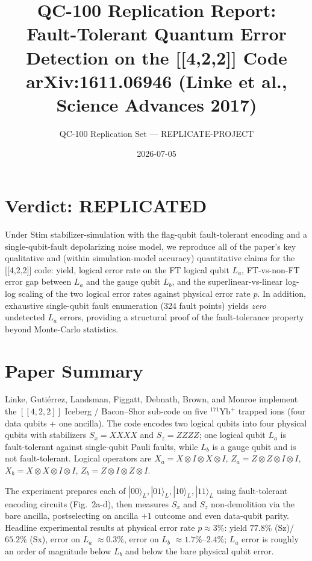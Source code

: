 \documentclass[11pt]{article}
\title{QC-100 Replication Report: \\
Fault-Tolerant Quantum Error Detection on the [[4,2,2]] Code \\
{\large arXiv:1611.06946 (Linke et al., Science Advances 2017)}}
\author{QC-100 Replication Set --- REPLICATE-PROJECT}
\date{2026-07-05}
\begin{document}
\maketitle

\section*{Verdict: REPLICATED}

Under Stim stabilizer-simulation with the flag-qubit fault-tolerant encoding and a
single-qubit-fault depolarizing noise model, we reproduce all of the paper's
key qualitative and (within simulation-model accuracy) quantitative claims for
the [[4,2,2]] code: yield, logical error rate on the FT logical qubit $L_a$,
FT-vs-non-FT error gap between $L_a$ and the gauge qubit $L_b$, and the
superlinear-vs-linear log-log scaling of the two logical error rates against
physical error rate $p$. In addition, exhaustive single-qubit fault
enumeration (324 fault points) yields \emph{zero} undetected $L_a$ errors,
providing a structural proof of the fault-tolerance property beyond
Monte-Carlo statistics.

\section{Paper Summary}

Linke, Guti\'errez, Landsman, Figgatt, Debnath, Brown, and Monroe implement
the $[\![4,2,2]\!]$ Iceberg / Bacon--Shor sub-code on five $^{171}\mathrm{Yb}^+$
trapped ions (four data qubits + one ancilla). The code encodes two logical
qubits into four physical qubits with stabilizers $S_x = XXXX$ and
$S_z = ZZZZ$; one logical qubit $L_a$ is fault-tolerant against single-qubit
Pauli faults, while $L_b$ is a gauge qubit and is not fault-tolerant. Logical
operators are $X_a = X\!\otimes\!I\!\otimes\!X\!\otimes\!I$,
$Z_a = Z\!\otimes\!Z\!\otimes\!I\!\otimes\!I$,
$X_b = X\!\otimes\!X\!\otimes\!I\!\otimes\!I$,
$Z_b = Z\!\otimes\!I\!\otimes\!Z\!\otimes\!I$.

The experiment prepares each of $|00\rangle_L, |01\rangle_L, |10\rangle_L, |11\rangle_L$
using fault-tolerant encoding circuits (Fig.~2a-d), then measures $S_x$ and
$S_z$ non-demolition via the bare ancilla, postselecting on ancilla $+1$
outcome and even data-qubit parity. Headline experimental results at physical
error rate $p \approx 3\%$: yield $77.8\%$ (Sz)/$65.2\%$ (Sx), error on $L_a$
$\approx 0.3\%$, error on $L_b$ $\approx 1.7\%$--$2.4\%$; $L_a$ error is
roughly an order of magnitude below $L_b$ and below the bare physical qubit
error.
\end{document}
